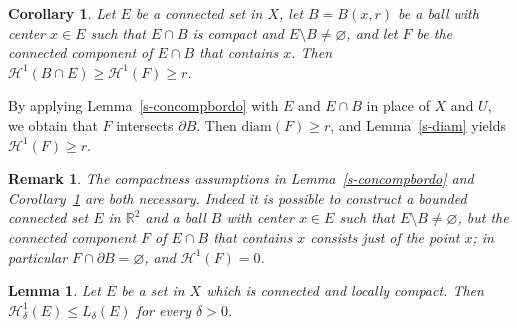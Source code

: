 \documentclass[11pt,reqno,a4paper,final]{amsart}
\makeatletter
\numberwithin{equation}{section}
\theoremstyle{mytheorem}
\newtheorem{lemma}[subsection]{Lemma}
\newtheorem{corollary}[subsection]{Corollary}
\theoremstyle{myremark}
\newtheorem{remark}[subsection]{Remark}
\theoremstyle{myparagraph}
\renewenvironment{proof}[1][\proofname]{\par 
  \pushQED{\qed}%
  \normalfont \topsep10\p@\@plus6\p@\relax 
  \trivlist 
  \item[\hskip\labelsep 
    \bfseries 
    #1\@addpunct{.}]\ignorespaces 
}{%
  \popQED\endtrivlist\@endpefalse 
}
\providecommand{\proofname}{Proof}
\newcommand{\R}{\mathbb{R}}
\newcommand{\Haus}{\mathscr{H}}
\newcommand{\bd}{\partial}
\newcommand{\diam}{\mathrm{diam}}
\makeatother
\begin{document}
\begin{corollary}
\label{s-concompball}
Let $E$ be a connected set in $X$, let $B=B(x,r)$ be 
a ball with center $x\in E$ such that $E\cap B$ is compact 
and $E\setminus B\ne\varnothing$, 
and let $F$ be the connected component of $E\cap B$ that contains
$x$. Then $\Haus^1(B\cap E)\ge\Haus^1(F)\ge r$.
\end{corollary}

\begin{proof}
By applying Lemma~\ref{s-concompbordo} with $E$ and $E\cap B$ in 
place of $X$ and $U$, we obtain that $F$ intersects $\bd B$.
Then $\diam(F) \ge r$, and Lemma~\ref{s-diam} yields $\Haus^1(F) \ge r$.
\end{proof}

\begin{remark}
\label{s-remcomp}
The compactness assumptions 
in Lemma~\ref{s-concompbordo} and Corollary~\ref{s-concompball}
are both necessary.
Indeed it is possible to construct a bounded connected set $E$ in $\R^2$
and a ball $B$ with center $x\in E$ such that $E\setminus B\ne\varnothing$, 
but the connected component $F$ of $E\cap B$ that contains $x$ consists just 
of the point $x$; in particular $F \cap \bd B=\varnothing$, 
and $\Haus^1(F)=0$.
\end{remark}


\begin{lemma}
\label{s-basiclemma}
Let $E$ be a set in $X$ which is connected and locally compact. 
Then $\Haus^1_\delta(E) \le L_\delta(E)$ for every $\delta>0$.
\end{lemma}
\end{document}
